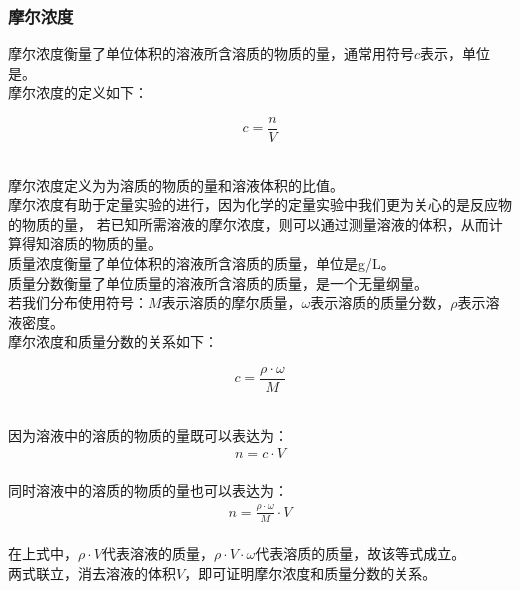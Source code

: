 \documentclass[UTF8]{ctexart}
\begin{document}
\subsubsection{摩尔浓度}
    摩尔浓度衡量了单位体积的溶液所含溶质的物质的量，通常用符号$c$表示，单位是。\\[3mm]
    摩尔浓度的定义如下：
    \begin{large}
        \begin{equation*}
            c=\frac{n}{V}
        \end{equation*}
    \end{large}\\
    摩尔浓度定义为为溶质的物质的量和溶液体积的比值。\\[3mm]
    摩尔浓度有助于定量实验的进行，因为化学的定量实验中我们更为关心的是反应物的物质的量，
    若已知所需溶液的摩尔浓度，则可以通过测量溶液的体积，从而计算得知溶质的物质的量。\\[8mm]
    质量浓度衡量了单位体积的溶液所含溶质的质量，单位是\si{g/L}。\\[3mm]
    质量分数衡量了单位质量的溶液所含溶质的质量，是一个无量纲量。\\[3mm]
    若我们分布使用符号：$M$表示溶质的摩尔质量，$\omega$表示溶质的质量分数，$\rho$表示溶液密度。\\[3mm]
    摩尔浓度和质量分数的关系如下：
    \begin{large}
        \begin{equation*}
            c=\frac{\rho\cdot\omega}{M}
        \end{equation*}
    \end{large}\\
    因为溶液中的溶质的物质的量既可以表达为：
    \setcounter{equation}{0}
    \begin{align}
        n=c\cdot V
    \end{align}\\
    同时溶液中的溶质的物质的量也可以表达为：
    \begin{align}
        n=\frac{\rho\cdot\omega}{M}\cdot V
    \end{align}\\
    在上式中，$\rho\cdot V$代表溶液的质量，$\rho\cdot V\cdot\omega$代表溶质的质量，故该等式成立。\\[3mm]
    两式联立，消去溶液的体积$V$，即可证明摩尔浓度和质量分数的关系。\\[3mm]

\newpage
\end{document}

